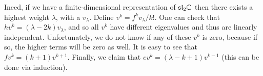 \documentclass{../mathnotes}
\begin{document}
Ineed, if we have a finite-dimensional representation of $\mathfrak{sl}_2\mathbb{C}$ then there exists a highest weight $\lambda$, with a $v_\lambda$.
Define $v^k=f^kv_\lambda/k!$. One can check that $hv^k=(\lambda-2k)v_\lambda$, and so all $v^k$ have different eigenvalues and thus are
linearly independent. Unfortunately, we do not know if any of these $v^k$ is zero, because if so, the higher terms will be zero as well.
It is easy to see that $fv^k=(k+1)v^{k+1}$. Finally, we claim that $ev^k=\left( \lambda-k+1 \right)v^{k-1}$ (this can be done via induction).
\end{document}
